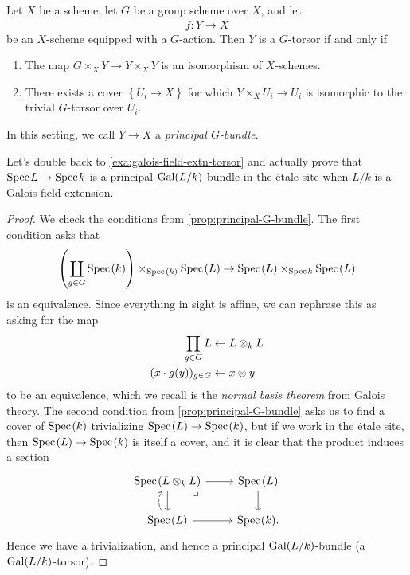 \documentclass[11pt,openany]{book}
\begin{document}
\begin{proposition}\label{prop:principal-G-bundle} 
Let $X$ be a scheme, let $G$ be a group scheme over $X$, and let
\begin{align*}
    f \colon Y \to X
\end{align*}
be an $X$-scheme equipped with a $G$-action. Then $Y$ is a $G$-torsor if and only if
\begin{enumerate}
    \item The map $G \times_X Y \to Y \times_X Y$ is an isomorphism of $X$-schemes.
    \item There exists a cover $\left\{ U_i \to X \right\}$ for which $Y \times_X U_i \to U_i$ is isomorphic to the trivial $G$-torsor over $U_i$.
\end{enumerate}
In this setting, we call $Y \to X$ a \textit{principal $G$-bundle}.
\end{proposition}

\begin{example} Let's double back to \autoref{exa:galois-field-extn-torsor} and actually prove that $\text{Spec}\hspace{0.1em} L \to \text{Spec}\hspace{0.1em} k$ is a principal $\mathrm{Gal}(L/k)$-bundle in the \'etale site when $L/k$ is a Galois field extension.
\end{example}
\begin{proof} We check the conditions from \autoref{prop:principal-G-bundle}. The first condition asks that
\begin{align*}
    \left(\coprod_{g\in G} \text{Spec}\hspace{0.1em}(k) \right) \times_{\text{Spec}\hspace{0.1em}(k)} \text{Spec}\hspace{0.1em} (L) \to \text{Spec}\hspace{0.1em}(L) \times_{\text{Spec}\hspace{0.1em} k} \text{Spec}\hspace{0.1em}(L)
\end{align*}
is an equivalence. Since everything in sight is affine, we can rephrase this as asking for the map
\begin{align*}
    \prod_{g\in G} L &\from L \otimes_k L \\
    (x \cdot g(y))_{g\in G} &\mapsfrom x \otimes y
\end{align*}
to be an equivalence, which we recall is the \textit{normal basis theorem} from Galois theory. The second condition from \autoref{prop:principal-G-bundle} asks us to find a cover of $\text{Spec}\hspace{0.1em}(k)$ trivializing $\text{Spec}\hspace{0.1em}(L) \to \text{Spec}\hspace{0.1em}(k)$, but if we work in the \'etale site, then $\text{Spec}\hspace{0.1em}(L) \to \text{Spec}\hspace{0.1em}(k)$ is itself a cover, and it is clear that the product induces a section
\[ \begin{tikzcd}
    \Spec(L \otimes_k L)\dar\rar\pb & \Spec(L)\dar\\
    \Spec(L)\rar\uar[dashed,bend left=30] & \Spec(k).
\end{tikzcd} \]
Hence we have a trivialization, and hence a principal $\mathrm{Gal}(L/k)$-bundle (a $\mathrm{Gal}(L/k)$-torsor).
\end{proof}
\end{document}
